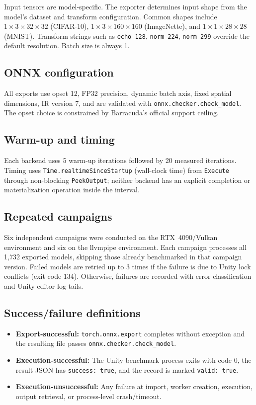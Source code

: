 \documentclass[10pt,twocolumn]{article}
\begin{document}
Input tensors are model-specific. The exporter determines input shape from the model's dataset and transform configuration. Common shapes include $1\times3\times32\times32$ (CIFAR-10), $1\times3\times160\times160$ (ImageNette), and $1\times1\times28\times28$ (MNIST). Transform strings such as \texttt{echo\_128}, \texttt{norm\_224}, \texttt{norm\_299} override the default resolution. Batch size is always 1.

\subsection{ONNX configuration}

All exports use opset 12, FP32 precision, dynamic batch axis, fixed spatial dimensions, IR version 7, and are validated with \texttt{onnx.checker.check\_model}. The opset choice is constrained by Barracuda's official support ceiling.

\subsection{Warm-up and timing}

Each backend uses 5 warm-up iterations followed by 20 measured iterations. Timing uses \texttt{Time.realtimeSinceStartup} (wall-clock time) from \texttt{Execute} through non-blocking \texttt{PeekOutput}; neither backend has an explicit completion or materialization operation inside the interval.

\subsection{Repeated campaigns}

Six independent campaigns were conducted on the RTX~4090/Vulkan environment and six on the llvmpipe environment. Each campaign processes all 1,732 exported models, skipping those already benchmarked in that campaign version. Failed models are retried up to 3 times if the failure is due to Unity lock conflicts (exit code 134). Otherwise, failures are recorded with error classification and Unity editor log tails.

\subsection{Success/failure definitions}

\begin{itemize}[nosep,leftmargin=*]
  \item \textbf{Export-successful:} \texttt{torch.onnx.export} completes without exception and the resulting file passes \texttt{onnx.checker.check\_model}.
  \item \textbf{Execution-successful:} The Unity benchmark process exits with code 0, the result JSON has \texttt{success: true}, and the record is marked \texttt{valid: true}.
  \item \textbf{Execution-unsuccessful:} Any failure at import, worker creation, execution, output retrieval, or process-level crash/timeout.
\end{itemize}
\end{document}
